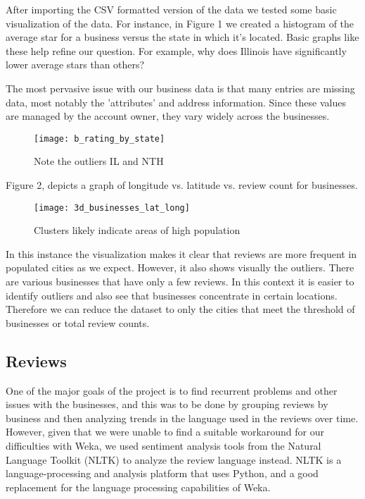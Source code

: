 \quad After importing the CSV formatted version of the data we tested some basic visualization of the data. For instance, in Figure 1 we created a histogram of the average star for a business versus the state in which it's located. Basic graphs like these help refine our question. For example, why does Illinois have significantly lower average stars than others? 

\quad The most pervasive issue with our business data is that many entries are missing data, most notably the 'attributes' and address information. Since these values are managed by the account owner, they vary widely across the businesses.

\begin{figure}[h]
\texttt{[image: b\_rating\_by\_state]}
\label{fig:Average star rating by state}
\caption{Note the outliers IL and NTH}
\end{figure}

Figure 2, depicts a graph of longitude vs. latitude vs. review count for businesses. 

\begin{figure}[!h]
\texttt{[image: 3d\_businesses\_lat\_long]}
\caption{Clusters likely indicate areas of high population}
\label{fig:Review count by latitude and longitude}
\end{figure}

In this instance the visualization makes it clear that reviews are more frequent in populated cities as we expect. However, it also shows visually the outliers. There are various businesses that have only a few reviews. In this context it is easier to identify outliers and also see that businesses concentrate in certain locations. Therefore we can reduce the dataset to only the cities that meet the threshold of businesses or total review counts. 

\subsection{Reviews}

\quad One of the major goals of the project is to find recurrent problems and other issues with the businesses, and this was to be done by grouping reviews by business and then analyzing trends in the language used in the reviews over time. However, given that we were unable to find a suitable workaround for our difficulties with Weka, we used sentiment analysis tools from the Natural Language Toolkit (NLTK) to analyze the review language instead. NLTK is a language-processing and analysis platform that uses Python, and a good replacement for the language processing capabilities of Weka. 

